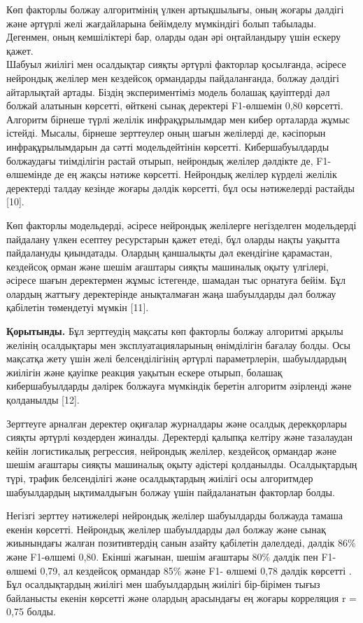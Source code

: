 \documentclass[
]{article}
\begin{document}
Көп факторлы болжау алгоритмінің үлкен артықшылығы, оның жоғары дәлдігі
және әртүрлі желі жағдайларына бейімделу мүмкіндігі болып табылады.
Дегенмен, оның кемшіліктері бар, оларды одан әрі оңтайландыру үшін
ескеру қажет.\\
Шабуыл жиілігі мен осалдықтар сияқты әртүрлі факторлар қосылғанда,
әсіресе нейрондық желілер мен кездейсоқ ормандарды пайдаланғанда, болжау
дәлдігі айтарлықтай артады. Біздің экспериментіміз модель болашақ
қауіптерді дәл болжай алатынын көрсетті, өйткені сынақ деректері
F1-өлшемін 0,80 көрсетті. Алгоритм бірнеше түрлі желілік инфрақұрылымдар
мен кибер орталарда жұмыс істейді. Мысалы, бірнеше зерттеулер оның шағын
желілерді де, кәсіпорын инфрақұрылымдарын да сәтті модельдейтінін
көрсетті. Кибершабуылдарды болжаудағы тиімділігін растай отырып,
нейрондық желілер дәлдікте де, F1-өлшемінде де ең жақсы нәтиже көрсетті.
Нейрондық желілер күрделі желілік деректерді талдау кезінде жоғары
дәлдік көрсетті, бұл осы нәтижелерді растайды {[}10{]}.

Көп факторлы модельдерді, әсіресе нейрондық желілерге негізделген
модельдерді пайдалану үлкен есептеу ресурстарын қажет етеді, бұл оларды
нақты уақытта пайдалануды қиындатады. Олардың қаншалықты дәл екендігіне
қарамастан, кездейсоқ орман және шешім ағаштары сияқты машиналық оқыту
үлгілері, әсіресе шағын деректермен жұмыс істегенде, шамадан тыс
орнатуға бейім. Бұл олардың жаттығу деректерінде анықталмаған жаңа
шабуылдарды дәл болжау қабілетін төмендетуі мүмкін {[}11{]}.

\textbf{Қорытынды.} Бұл зерттеудің мақсаты көп факторлы болжау алгоритмі
арқылы желінің осалдықтары мен эксплуатацияларының өнімділігін бағалау
болды. Осы мақсатқа жету үшін желі белсенділігінің әртүрлі
параметрлерін, шабуылдардың жиілігін және қауіпке реакция уақытын ескере
отырып, болашақ кибершабуылдарды дәлірек болжауға мүмкіндік беретін
алгоритм әзірленді және қолданылды {[}12{]}.

Зерттеуге арналған деректер оқиғалар журналдары және осалдық
дерекқорлары сияқты әртүрлі көздерден жиналды. Деректерді қалыпқа
келтіру және тазалаудан кейін логистикалық регрессия, нейрондық желілер,
кездейсоқ ормандар және шешім ағаштары сияқты машиналық оқыту әдістері
қолданылды. Осалдықтардың түрі, трафик белсенділігі және осалдықтардың
жиілігі осы алгоритмдер шабуылдардың ықтималдығын болжау үшін
пайдаланатын факторлар болды.

Негізгі зерттеу нәтижелері нейрондық желілер шабуылдарды болжауда тамаша
екенін көрсетті. Нейрондық желілер шабуылдарды дәл болжау және сынақ
жиынындағы жалған позитивтердің санын азайту қабілетін дәлелдеді, дәлдік
86\% және F1-өлшемі 0,80. Екінші жағынан, шешім ағаштары 80\% дәлдік пен
F1-өлшемі 0,79, ал кездейсоқ ормандар 85\% және F1- өлшемі 0,78 дәлдік
көрсетті . Бұл осалдықтардың жиілігі мен шабуылдардың жиілігі
бір-бірімен тығыз байланысты екенін көрсетті және олардың арасындағы ең
жоғары корреляция r = 0,75 болды.
\end{document}
